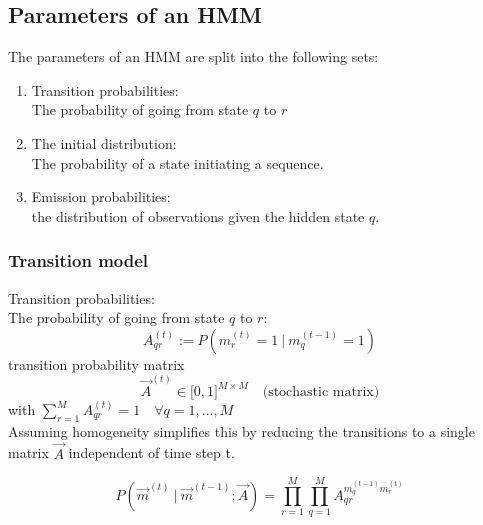 \subsection{Parameters of an HMM}


\begin{frame}{\subsecname}

The parameters of an HMM are split into the following sets:
\begin{enumerate}
\item {Transition probabilities}:\\
The probability of going from state $q$ to $r$ 
\item The initial distribution:\\
The probability of a state initiating a sequence.  
\item Emission probabilities:\\
the distribution of observations given the hidden state $q$.  
\end{enumerate}

\end{frame}

\subsubsection{Transition model}
\label{sec:hmm_transition}

\begin{frame}{\subsubsecname}

Transition probabilities:\\

The probability of going from state $q$ to $r$:\\

\begin{equation}
	A_{qr}^{(t)} :=	P(m_r^{(t)} = 1 ~|~  m_q^{(t - 1)} = 1)
\end{equation}
transition probability matrix
\begin{equation}
	\vec A^{(t)} \in \lbrack 0, 1\rbrack^{M\times M} \quad \text{(stochastic matrix)}
\end{equation}
with $\sum_{r=1}^M A_{qr}^{(t)} = 1 \quad \forall q= 1, \dots, M$\\
Assuming homogeneity simplifies this by reducing the transitions to a single matrix $\vec A$ independent of time step t.

\pause

\begin{equation}
P(\vec{m}^{(t)} ~|~ \vec{m}^{(t - 1)}; \vec{A}) = \prod_{r=1}^M \prod_{q=1}^M A_{qr}^{m_q^{(t-1)} m_r^{(t)}}
\end{equation}

\end{frame}

